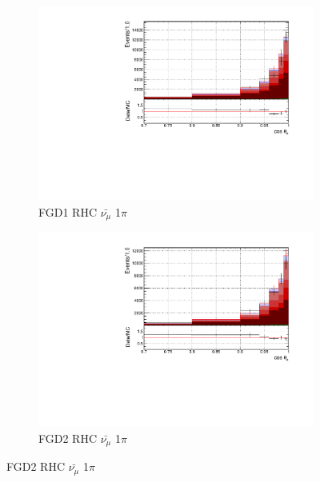 \begin{figure}[!h]
\begin{subfigure}{0.49\textwidth}
  \centering
  \includegraphics[width=\textwidth]{figs/FGD1_anti-numuCC_1pi_t}
  \caption{FGD1 RHC $\bar{\nu_{\mu}}$ 1$\pi$}
\end{subfigure}
\centering
\begin{subfigure}{0.49\textwidth}
  \centering
  \includegraphics[width=\textwidth]{figs/FGD2_anti-numuCC_1pi_t}
  \caption{FGD2 RHC $\bar{\nu_{\mu}}$ 1$\pi$}
\end{subfigure}


\end{figure}
